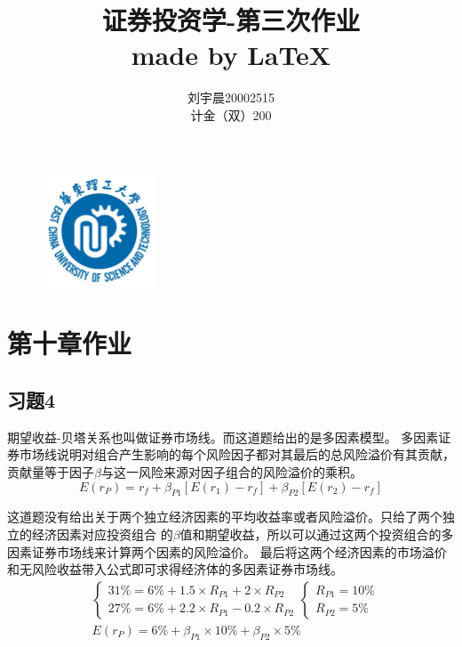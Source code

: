 \documentclass{article}
\title{\Huge 证券投资学-第三次作业    \\\large made by  \LaTeX}
\author{刘宇晨\hspace*{25pt}20002515\\计金（双）200}
\begin{document}
 
\begin{figure}[H]
    \begin{center}
        \includegraphics[width=0.3\textwidth]{logo.jpeg}
        \maketitle
    \end{center}
\end{figure}
\thispagestyle{empty}
\clearpage
{}
\section*{\center 第十章作业}
\subsection*{习题4}
期望收益-贝塔关系也叫做证券市场线。而这道题给出的是多因素模型。
多因素证券市场线说明对组合产生影响的每个风险因子都对其最后的总风险溢价有其贡献，
贡献量等于因子$\beta$与这一风险来源对因子组合的风险溢价的乘积。
\[E(r_P)=r_f+\beta_{P1}[E(r_1)-r_f]+\beta_{P2}[E(r_2)-r_f]\]

这道题没有给出关于两个独立经济因素的平均收益率或者风险溢价。只给了两个独立的经济因素对应投资组合
的$\beta$值和期望收益，所以可以通过这两个投资组合的多因素证券市场线来计算两个因素的风险溢价。
最后将这两个经济因素的市场溢价和无风险收益带入公式即可求得经济体的多因素证券市场线。
\nonumber
\begin{align}
    &\begin{cases}
        31\%=6\%+1.5\times R_{P1}+2\times R_{P2}\\
        27\%=6\%+2.2\times R_{P1}-0.2\times R_{P2}
    \end{cases}
    \begin{cases}
        R_{P1}=10\%\\
        R_{P2}=5\%
    \end{cases}\\
    &E(r_P)=6\%+\beta_{P1}\times 10\%+\beta_{P2}\times 5\%
\end{align}
\end{document}
